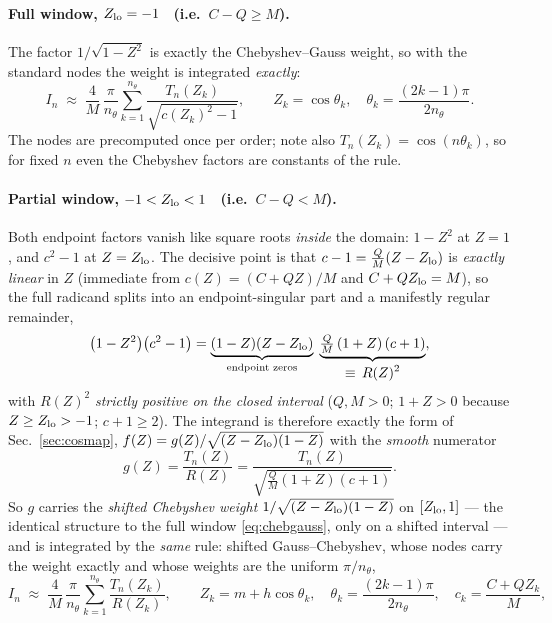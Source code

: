 \documentclass[11pt]{article}
\begin{document}
\paragraph{Full window, $Z_{\rm lo}=-1$ \ (i.e.\ $C-Q\ge M$).}
The factor $1/\sqrt{1-Z^{2}}$ is exactly the Chebyshev--Gauss weight, so
with the standard nodes the weight is integrated \emph{exactly}:
\begin{equation}
I_n\;\approx\;\frac{4}{M}\,\frac{\pi}{n_\theta}
\sum_{k=1}^{n_\theta}\frac{T_n(Z_k)}{\sqrt{c(Z_k)^{2}-1}},
\qquad
Z_k=\cos\theta_k,\quad \theta_k=\frac{(2k-1)\pi}{2n_\theta}.
\label{eq:chebgauss}
\end{equation}
The nodes are precomputed once per order; note also
$T_n(Z_k)=\cos(n\theta_k)$, so for fixed $n$ even the Chebyshev factors
are constants of the rule.

\paragraph{Partial window, $-1<Z_{\rm lo}<1$ \ (i.e.\ $C-Q<M$).}
Both endpoint factors vanish like square roots \emph{inside} the domain:
$1-Z^{2}$ at $Z=1$, and $c^{2}-1$ at $Z=Z_{\rm lo}$.  The decisive point is
that $c-1=\tfrac{Q}{M}(Z-Z_{\rm lo})$ is \emph{exactly linear} in $Z$
(immediate from $c(Z)=(C+QZ)/M$ and $C+QZ_{\rm lo}=M$), so the full
radicand splits into an endpoint-singular part and a manifestly regular
remainder,
\begin{equation}
\big(1-Z^{2}\big)\big(c^{2}-1\big)
=\underbrace{(1-Z)(Z-Z_{\rm lo})}_{\text{endpoint zeros}}\;
 \underbrace{\tfrac{Q}{M}\,(1+Z)\,(c+1)}_{\displaystyle \equiv\,R(Z)^{2}} ,
\label{eq:zfactor}
\end{equation}
with $R(Z)^{2}$ \emph{strictly positive on the closed interval}
($Q,M>0$; $1+Z>0$ because $Z\ge Z_{\rm lo}>-1$; $c+1\ge2$).  The integrand
is therefore exactly the form of Sec.~\ref{sec:cosmap},
$f(Z)=g(Z)/\sqrt{(Z-Z_{\rm lo})(1-Z)}$ with the \emph{smooth} numerator
\begin{equation}
g(Z)=\frac{T_n(Z)}{R(Z)}
     =\frac{T_n(Z)}{\sqrt{\tfrac{Q}{M}(1+Z)(c+1)}} .
\label{eq:zsmooth}
\end{equation}
So $g$ carries the \emph{shifted Chebyshev weight}
$1/\sqrt{(Z-Z_{\rm lo})(1-Z)}$ on $[Z_{\rm lo},1]$ --- the identical
structure to the full window \eqref{eq:chebgauss}, only on a shifted
interval --- and is integrated by the \emph{same} rule: shifted
Gauss--Chebyshev, whose nodes carry the weight exactly and whose weights are
the uniform $\pi/n_\theta$,
\begin{equation}
I_n\;\approx\;\frac{4}{M}\,\frac{\pi}{n_\theta}
\sum_{k=1}^{n_\theta} \frac{T_n(Z_k)}{R(Z_k)},
\qquad
Z_k=m+h\cos\theta_k,\quad \theta_k=\frac{(2k-1)\pi}{2n_\theta},
\quad c_k=\frac{C+QZ_k}{M},
\label{eq:zpartial}
\end{equation}
\end{document}
